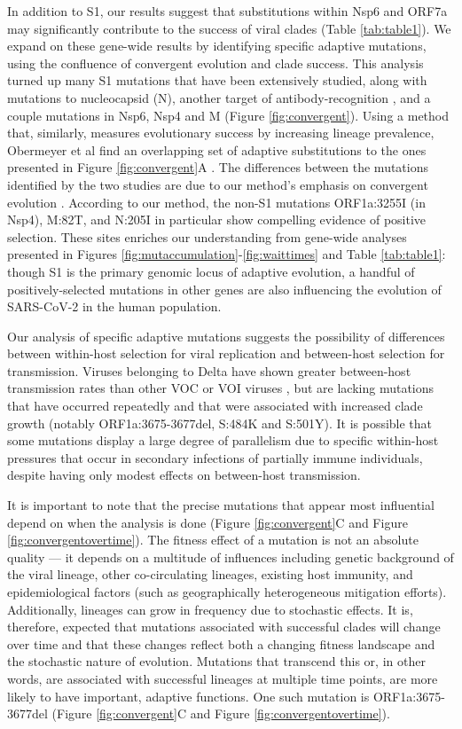 \documentclass[11pt,oneside,letterpaper]{article}
\begin{document}
In addition to S1, our results suggest that substitutions within Nsp6 and ORF7a may significantly contribute to the success of viral clades (Table \ref{tab:table1}).
We expand on these gene-wide results by identifying specific adaptive mutations, using the confluence of convergent evolution and clade success.
This analysis turned up many S1 mutations that have been extensively studied, along with mutations to nucleocapsid (N), another target of antibody-recognition \cite{Kang2021-pe}, and a couple mutations in Nsp6, Nsp4 and M (Figure \ref{fig:convergent}). 
Using a method that, similarly, measures evolutionary success by increasing lineage prevalence, Obermeyer et al find an overlapping set of adaptive substitutions to the ones presented in Figure \ref{fig:convergent}A \cite{Obermeyer2021-fk}. 
The differences between the mutations identified by the two studies are due to our method's emphasis on convergent evolution \cite{Obermeyer2021-fk}.
According to our method, the non-S1 mutations ORF1a:3255I (in Nsp4), M:82T, and N:205I in particular show compelling evidence of positive selection.
These sites enriches our understanding from gene-wide analyses presented in Figures \ref{fig:mutaccumulation}-\ref{fig:waittimes} and Table \ref{tab:table1}: though S1 is the primary genomic locus of adaptive evolution, a handful of positively-selected mutations in other genes are also influencing the evolution of SARS-CoV-2 in the human population.

Our analysis of specific adaptive mutations suggests the possibility of differences between within-host selection for viral replication and between-host selection for transmission.
Viruses belonging to Delta have shown greater between-host transmission rates than other VOC or VOI viruses \cite{Campbell2021-cx}, but are lacking mutations that have occurred repeatedly and that were associated with increased clade growth (notably ORF1a:3675-3677del, S:484K and S:501Y).
It is possible that some mutations display a large degree of parallelism due to specific within-host pressures that occur in secondary infections of partially immune individuals, despite having only modest effects on between-host transmission.

It is important to note that the precise mutations that appear most influential depend on when the analysis is done (Figure \ref{fig:convergent}C and Figure \ref{fig:convergentovertime}).
The fitness effect of a mutation is not an absolute quality --- it depends on a multitude of influences including genetic background of the viral lineage, other co-circulating lineages, existing host immunity, and epidemiological factors (such as geographically heterogeneous mitigation efforts).
Additionally, lineages can grow in frequency due to stochastic effects. 
It is, therefore, expected that mutations associated with successful clades will change over time and that these changes reflect both a changing fitness landscape and the stochastic nature of evolution.
Mutations that transcend this or, in other words, are associated with successful lineages at multiple time points, are more likely to have important, adaptive functions.
One such mutation is ORF1a:3675-3677del (Figure \ref{fig:convergent}C and Figure \ref{fig:convergentovertime}).
\end{document}
